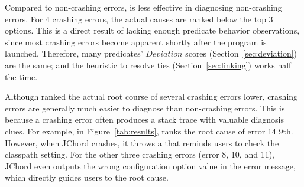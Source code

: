 
Compared to non-crashing errors, \ourtool is less effective
in diagnosing non-crashing errors. For 4 crashing errors,
the actual causes are ranked below the top 3 options.
This is a direct result of lacking enough predicate behavior observations,
since most crashing errors become apparent shortly
after the program is launched. Therefore, many predicates' $Deviation$ scores
 (Section~\ref{sec:deviation}) are the same; and the heuristic to resolve ties (Section~\ref{sec:linking})
works half the time.




Although \ourtool ranked the actual root course of several
crashing errors lower, crashing errors are generally much easier to diagnose than non-crashing errors.
This is because a crashing error often produces a stack trace with valuable diagnosis clues.
For example, in Figure~\ref{tab:results}, \ourtool ranks the root cause of
error 14  9th.
However, when JChord crashes, it throws a 
that reminds users to check the classpath setting. For the other three crashing errors (error 8, 10, and 11),
JChord even outputs the wrong configuration option value in the
error message, which
directly guides users to the root cause. 









